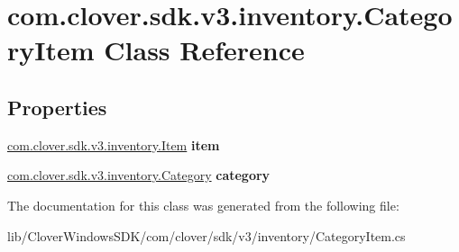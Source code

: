 \hypertarget{classcom_1_1clover_1_1sdk_1_1v3_1_1inventory_1_1_category_item}{}\section{com.\+clover.\+sdk.\+v3.\+inventory.\+Category\+Item Class Reference}
\label{classcom_1_1clover_1_1sdk_1_1v3_1_1inventory_1_1_category_item}
\subsection*{Properties}
\begin{DoxyCompactItemize}
\item 
\mbox{\label{classcom_1_1clover_1_1sdk_1_1v3_1_1inventory_1_1_category_item_aebd9e1e579acd93f92ef14a52da5cd82}} 
\hyperlink{classcom_1_1clover_1_1sdk_1_1v3_1_1inventory_1_1_item}{com.\+clover.\+sdk.\+v3.\+inventory.\+Item} {\bfseries item}
\item 
\mbox{\label{classcom_1_1clover_1_1sdk_1_1v3_1_1inventory_1_1_category_item_abb4af350e8e93b69611c70db4bbba0aa}} 
\hyperlink{classcom_1_1clover_1_1sdk_1_1v3_1_1inventory_1_1_category}{com.\+clover.\+sdk.\+v3.\+inventory.\+Category} {\bfseries category}
\end{DoxyCompactItemize}


The documentation for this class was generated from the following file\+:\begin{DoxyCompactItemize}
\item 
lib/\+Clover\+Windows\+S\+D\+K/com/clover/sdk/v3/inventory/Category\+Item.\+cs\end{DoxyCompactItemize}
